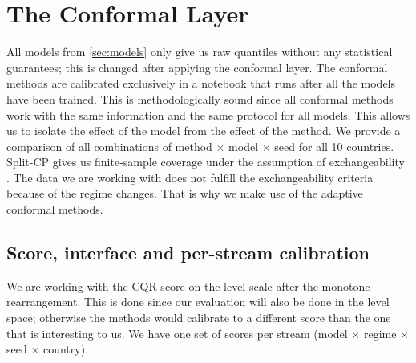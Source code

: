\section{The Conformal Layer}
\label{sec:conformal}
All models from \cref{sec:models} only give us raw quantiles without any statistical guarantees; this is changed after applying the conformal layer. The conformal methods are calibrated exclusively in a notebook that runs after all the models have been trained. This is methodologically sound since all conformal methods work with the same information and the same protocol for all models. This allows us to isolate the effect of the model from the effect of the method. We provide a comparison of all combinations of method $\times$ model $\times$ seed for all 10 countries. Split-CP gives us finite-sample coverage under the assumption of exchangeability \parencite{vovk2005algorithmic,lei2018distribution}. The data we are working with does not fulfill the exchangeability criteria because of the regime changes. That is why we make use of the adaptive conformal methods.

\subsection{Score, interface and per-stream calibration}
\label{sec:conformal:score}
We are working with the CQR-score \parencite{romano2019cqr} on the level scale after the monotone rearrangement. This is done since our evaluation will also be done in the level space; otherwise the methods would calibrate to a different score than the one that is interesting to us. We have one set of scores per stream (model $\times$ regime $\times$ seed $\times$ country).

